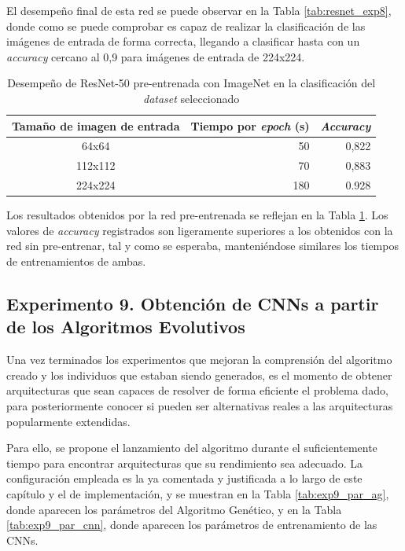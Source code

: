 El desempeño final de esta red se puede observar en la Tabla \ref{tab:resnet_exp8}, donde como se puede comprobar es capaz de realizar la clasificación de las imágenes de entrada de forma correcta, llegando a clasificar hasta con un \textit{accuracy} cercano al 0,9 para imágenes de entrada de 224x224.

\begin{table}[h]
\caption{Desempeño de ResNet-50 pre-entrenada con ImageNet en la clasificación del \textit{dataset} seleccionado}
\label{tab:resnet_imagenet_exp8}
\centering
\begin{tabular}{c|r|r}
\toprule
\multicolumn{1}{c|}{\textbf{Tamaño de imagen de entrada}} & \multicolumn{1}{c|}{\textbf{Tiempo por \textit{epoch} (s)}} & \multicolumn{1}{c}{\textit{\textbf{Accuracy}}} \\ \hline
64x64                                                     & 50    & 0,822 \\
112x112                                                   & 70    & 0,883 \\
224x224                                                   & 180   & 0.928 \\
\bottomrule
\end{tabular}
\end{table}

Los resultados obtenidos por la red pre-entrenada se reflejan en la Tabla \ref{tab:resnet_imagenet_exp8}. Los valores de \textit{accuracy} registrados son ligeramente superiores a los obtenidos con la red sin pre-entrenar, tal y como se esperaba, manteniéndose similares los tiempos de entrenamientos de ambas.


\subsection{Experimento 9. Obtención de CNNs a partir de los Algoritmos Evolutivos}

Una vez terminados los experimentos que mejoran la comprensión del algoritmo creado y los individuos que estaban siendo generados, es el momento de obtener arquitecturas que sean capaces de resolver de forma eficiente el problema dado, para posteriormente conocer si pueden ser alternativas reales a las arquitecturas popularmente extendidas.

Para ello, se propone el lanzamiento del algoritmo durante el suficientemente tiempo para encontrar arquitecturas que su rendimiento sea adecuado. La configuración empleada es la ya comentada y justificada a lo largo de este capítulo y el de implementación, y se muestran en la Tabla \ref{tab:exp9_par_ag}, donde aparecen los parámetros del Algoritmo Genético, y en la Tabla \ref{tab:exp9_par_cnn}, donde aparecen los parámetros de entrenamiento de las CNNs.

